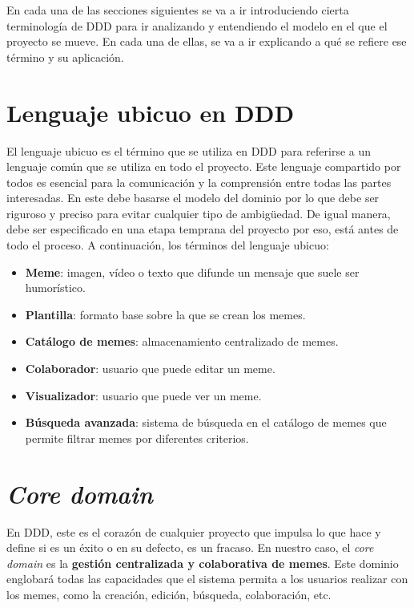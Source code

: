 En cada una de las secciones siguientes se va a ir introduciendo cierta terminología de DDD para ir analizando y entendiendo el modelo en el que el proyecto se mueve. En cada una de ellas, se va a ir explicando a qué se refiere ese término y su aplicación.

\section{Lenguaje ubicuo en DDD}

El lenguaje ubicuo es el término que se utiliza en DDD para referirse a un lenguaje común que se utiliza en todo el proyecto. Este lenguaje compartido por todos es esencial para la comunicación y la comprensión entre todas las partes interesadas. En este debe basarse el modelo del dominio por lo que debe ser riguroso y preciso para evitar cualquier tipo de ambigüedad. De igual manera, debe ser especificado en una etapa temprana del proyecto por eso, está antes de todo el proceso. A continuación, los términos del lenguaje ubicuo:

\begin{itemize}
    \item \textbf{Meme}: imagen, vídeo o texto que difunde un mensaje que suele ser humorístico.
    \item \textbf{Plantilla}: formato base sobre la que se crean los memes.
    \item \textbf{Catálogo de memes}: almacenamiento centralizado de memes.
    \item \textbf{Colaborador}: usuario que puede editar un meme.
    \item \textbf{Visualizador}: usuario que puede ver un meme.
    \item \textbf{Búsqueda avanzada}: sistema de búsqueda en el catálogo de memes que permite filtrar memes por diferentes criterios.
\end{itemize}

\section{\textit{Core domain}}

En DDD, este es el corazón de cualquier proyecto que impulsa lo que hace y define si es un éxito o en su defecto, es un fracaso. En nuestro caso, el \textit{core domain} es la \textbf{gestión centralizada y colaborativa de memes}. Este dominio englobará todas las capacidades que el sistema permita a los usuarios realizar con los memes, como la creación, edición, búsqueda, colaboración, etc.

